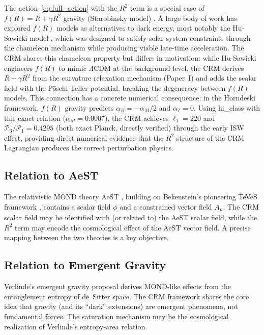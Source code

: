 \documentclass[aps,prd,twocolumn,superscriptaddress,nofootinbib]{revtex4-2}
\begin{document}
The action~\eqref{eq:full_action} with the $R^2$ term is a special case of $f(R) = R + \gamma R^2$ gravity (Starobinsky model) \cite{Starobinsky1980}. A large body of work has explored $f(R)$ models as alternatives to dark energy, most notably the Hu-Sawicki model \cite{HuSawicki2007}, which was designed to satisfy solar system constraints through the chameleon mechanism while producing viable late-time acceleration. The CRM shares this chameleon property but differs in motivation: while Hu-Sawicki engineers $f(R)$ to mimic $\Lambda$CDM at the background level, the CRM derives $R + \gamma R^2$ from the curvature relaxation mechanism (Paper~I) and adds the scalar field with the P\"oschl-Teller potential, breaking the degeneracy between $f(R)$ models. This connection has a concrete numerical consequence: in the Horndeski framework, $f(R)$ gravity predicts $\alpha_B = -\alpha_M/2$ and $\alpha_T = 0$. Using hi\_class \cite{Zumalacarregui2017} with this exact relation ($\alpha_M = 0.0007$), the CRM achieves $\ell_1 = 220$ and $\mathcal{P}_3/\mathcal{P}_1 = 0.4295$ (both exact Planck, directly verified) through the early ISW effect, providing direct numerical evidence that the $R^2$ structure of the CRM Lagrangian produces the correct perturbation physics.

\subsection{Relation to AeST}

The relativistic MOND theory AeST \cite{Skordis2021}, building on Bekenstein's pioneering TeVeS framework \cite{Bekenstein2004}, contains a scalar field $\phi$ and a constrained vector field $A_\mu$. The CRM scalar field may be identified with (or related to) the AeST scalar field, while the $R^2$ term may encode the cosmological effect of the AeST vector field. A precise mapping between the two theories is a key objective.

\subsection{Relation to Emergent Gravity}

Verlinde's emergent gravity proposal \cite{Verlinde2017} derives MOND-like effects from the entanglement entropy of de~Sitter space. The CRM framework shares the core idea that gravity (and its ``dark'' extensions) are emergent phenomena, not fundamental forces. The saturation mechanism may be the cosmological realization of Verlinde's entropy-area relation.
\end{document}
